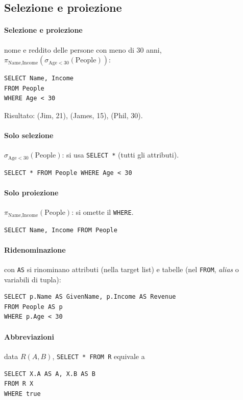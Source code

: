 \documentclass[a4paper,12pt]{article}
\begin{document}
\subsection{Selezione e proiezione}

\paragraph{Selezione e proiezione} nome e reddito delle persone con meno di 30
anni, $\pi_{\text{Name},\text{Income}}(\sigma_{\text{Age}<30}(\text{People}))$:
\begin{verbatim}
SELECT Name, Income
FROM People
WHERE Age < 30
\end{verbatim}
Risultato: (Jim, 21), (James, 15), (Phil, 30).

\paragraph{Solo selezione} $\sigma_{\text{Age}<30}(\text{People})$: si usa
\texttt{SELECT *} (tutti gli attributi).
\begin{verbatim}
SELECT * FROM People WHERE Age < 30
\end{verbatim}

\paragraph{Solo proiezione} $\pi_{\text{Name},\text{Income}}(\text{People})$:
si omette il \texttt{WHERE}.
\begin{verbatim}
SELECT Name, Income FROM People
\end{verbatim}

\paragraph{Ridenominazione} con \texttt{AS} si rinominano attributi (nella
target list) e tabelle (nel \texttt{FROM}, \emph{alias} o variabili di
tupla):
\begin{verbatim}
SELECT p.Name AS GivenName, p.Income AS Revenue
FROM People AS p
WHERE p.Age < 30
\end{verbatim}

\paragraph{Abbreviazioni} data $R(A,B)$, \texttt{SELECT * FROM R} equivale a
\begin{verbatim}
SELECT X.A AS A, X.B AS B
FROM R X
WHERE true
\end{verbatim}
\end{document}
